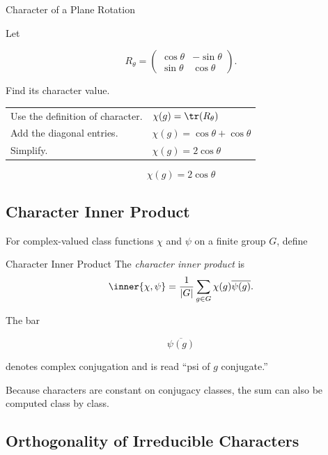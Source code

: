 \begin{workedexamplebox}{Character of a Plane Rotation}

Let

\[ R_\theta=
\begin{pmatrix}
\cos\theta&-\sin\theta\\
\sin\theta&\cos\theta
\end{pmatrix}. \]

Find its character value.

\begin{tabularx}{\textwidth}{@{}>{\raggedright\arraybackslash}p{}X@{}}
Use the definition of character. & \(\chi(g)=\tr(R_\theta)\)\\
Add the diagonal entries. & \(\chi(g)=\cos\theta+\cos\theta\)\\
Simplify. & \(\chi(g)=2\cos\theta\)
\end{tabularx}

\begin{answerbox}
\[ \boxed{\chi(g)=2\cos\theta} \]
\end{answerbox}
\end{workedexamplebox}

\subsection{Character Inner Product}
\label{subsec:character-inner-product}

For complex-valued class functions \(\chi\) and \(\psi\) on a finite group
\(G\), define

\begin{definitionbox}{Character Inner Product}
The \emph{character inner product} is
\[ \inner{\chi,\psi}
=\frac{1}{|G|}\sum_{g\in G}\chi(g)\overline{\psi(g)}. \]
\end{definitionbox}

The bar

\[ \overline{\psi(g)} \]

denotes complex conjugation and is read ``psi of \(g\) conjugate.''

Because characters are constant on conjugacy classes, the sum can also be
computed class by class.

\subsection{Orthogonality of Irreducible Characters}
\label{subsec:character-orthogonality}

